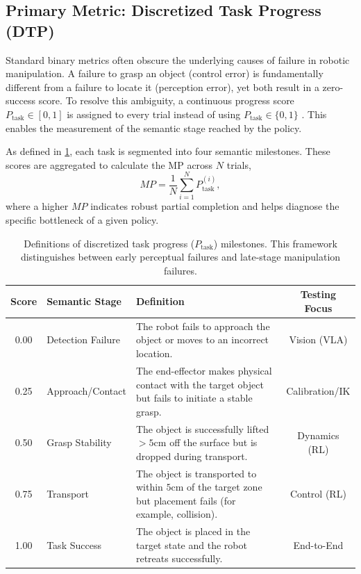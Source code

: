 \subsection{Primary Metric: Discretized Task Progress (DTP)}
Standard binary metrics often obscure the underlying causes of failure in robotic manipulation. A failure to grasp an object (control error) is fundamentally different from a failure to locate it (perception error), yet both result in a zero-success score. To resolve this ambiguity, a continuous progress score $P_{\text{task}} \in [0, 1]$ is assigned to every trial instead of using $P_{\text{task}} \in \{0, 1\}$ \cite{PI02024}. This enables the measurement of the semantic stage reached by the policy.

As defined in \cref{tab:dtp_definitions}, each task is segmented into four semantic milestones. These scores are aggregated to calculate the \ac{MP} across $N$ trials,
\begin{equation}
MP = \frac{1}{N} \sum_{i=1}^{N} P_{\text{task}}^{(i)},
\end{equation}
where a higher $MP$ indicates robust partial completion and helps diagnose the specific bottleneck of a given policy.

\begin{table}[H]
  \myfloatalign
  \scriptsize
  \caption{Definitions of discretized task progress ($P_{\text{task}}$) milestones. This framework distinguishes between early perceptual failures and late-stage manipulation failures.}
  \label{tab:dtp_definitions}
  \begin{tabularx}{\textwidth}{c X X c}
    \toprule
    \textbf{Score} & \textbf{Semantic Stage} & \textbf{Definition} & \textbf{Testing Focus} \\
    \midrule
    0.00 & Detection Failure & The robot fails to approach the object or moves to an incorrect location. & Vision (VLA) \\
    0.25 & Approach/Contact & The end-effector makes physical contact with the target object but fails to initiate a stable grasp. & Calibration/IK \\
    0.50 & Grasp Stability & The object is successfully lifted $>5$cm off the surface but is dropped during transport. & Dynamics (RL) \\
    0.75 & Transport & The object is transported to within $5$cm of the target zone but placement fails (for example, collision). & Control (RL) \\
    1.00 & Task Success & The object is placed in the target state and the robot retreats successfully. & End-to-End \\
    \bottomrule
  \end{tabularx}
\end{table}


